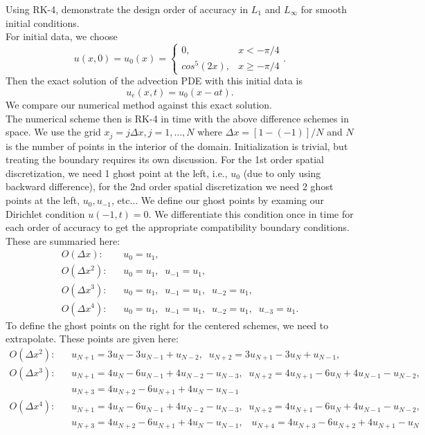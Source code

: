 \item Using RK-4, demonstrate the design order of accuracy in $L_1$ and $L_\infty$ for smooth initial conditions.\\

For initial data, we choose 
$$u(x,0)=u_0(x)=\left\{\begin{array}{cc}0,&x<-\pi/4\\ cos^{5}(2x),&x\geq -\pi/4\end{array}\right..$$
 Then the exact solution of the advection PDE with this initial data is
$$u_e(x,t)=u_0(x-at).$$
We compare our numerical method against this exact solution.\\

The numerical scheme then is RK-4 in time with the above difference schemes in space. We use the grid $x_j=j\Delta x, j=1,...,N$ where $\Delta x=[1-(-1)]/N$ and $N$ is the number of points in the interior of the domain. Initialization is trivial, but treating the boundary requires its own discussion. For the 1st order spatial discretization, we need 1 ghost point at the left, i.e., $u_0$ (due to only using backward difference), for the 2nd order spatial discretization we need 2 ghost points at the left, $u_0,u_{-1}$, etc... We define our ghost points by examing our Dirichlet condition $u(-1,t)=0.$ We differentiate this condition once in time for each order of accuracy to get the appropriate compatibility boundary conditions. These are summaried here:
\begin{align*}
O(\Delta x):&\;\;\; u_{0}=u_1,\\
O(\Delta x^2):&\;\;\; u_0=u_1,\;\; u_{-1}=u_1,\\
O(\Delta x^3):&\;\;\; u_0=u_1,\;\; u_{-1}=u_1,\;\; u_{-2}=u_1,\\
O(\Delta x^4):&\;\;\; u_0=u_1,\;\; u_{-1}=u_1,\;\; u_{-2}=u_1,\;\; u_{-3}=u_1.
\end{align*}
To define the ghost points on the right for the centered schemes, we need to extrapolate. These points are given here:
\begin{align*}
O(\Delta x^2):&\;\;\; u_{N+1}=3u_N-3u_{N-1}+u_{N-2},\;\; u_{N+2}=3u_{N+1}-3u_N+u_{N-1},\\
O(\Delta x^3):&\;\;\; u_{N+1}=4u_N-6u_{N-1}+4u_{N-2}-u_{N-3},\;\; u_{N+2}=4u_{N+1}-6u_N+4u_{N-1}-u_{N-2},\\
&\;\;\;u_{N+3}=4u_{N+2}-6u_{N+1}+4u_{N}-u_{N-1}\\
O(\Delta x^4):&\;\;\; u_{N+1}=4u_N-6u_{N-1}+4u_{N-2}-u_{N-3},\;\; u_{N+2}=4u_{N+1}-6u_N+4u_{N-1}-u_{N-2},\\
&\;\;\;u_{N+3}=4u_{N+2}-6u_{N+1}+4u_{N}-u_{N-1},\;\;\; u_{N+4}=4u_{N+3}-6u_{N+2}+4u_{N+1}-u_{N}\\
\end{align*}

